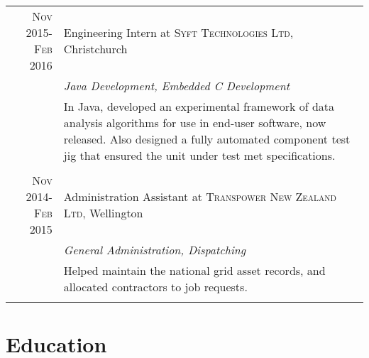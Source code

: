 \documentclass[a4paper,10pt]{article} %
\begin{document}
\begin{tabular}{r|p{11cm}}

\textsc{Nov 2015-Feb 2016} & Engineering Intern at \textsc{Syft Technologies Ltd}, Christchurch \\
& \emph{Java Development, Embedded C Development}\\
& \footnotesize{In Java, developed an experimental framework of data analysis algorithms for use in end-user software, now released. Also designed a fully automated component test jig that ensured the unit under test met specifications. } \\
\multicolumn{2}{c}{} \\




\textsc{Nov 2014-Feb 2015} & Administration Assistant at \textsc{Transpower New Zealand Ltd}, Wellington \\
& \emph{General Administration, Dispatching}\\
& \footnotesize{Helped maintain the national grid asset records, and allocated contractors to job requests. } \\
\multicolumn{2}{c}{} \\




\end{tabular}


\section{Education}
\end{document}
